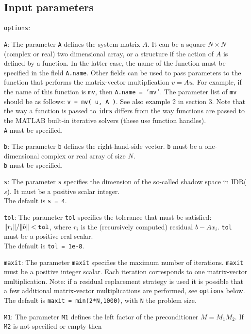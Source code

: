 \documentclass[prodmode,acmtoms]{acmsmall}
\begin{document}
\subsection{Input parameters}
\begin{describe}{{\tt options}:}
\item[{\tt A}:] The parameter {\tt A} defines the system matrix $A$. It can be a square $N \times N$ (complex or real) two dimensional array, 
or a structure if the action of $A$ is defined by a function. In the latter case, the name of the function must be specified in the field 
{\tt A.name}. Other fields can be used to pass parameters to the function that performs the matrix-vector multiplication $v = Au$.  For example, 
if the name of this function is {\tt mv}, then {\tt A.name = 'mv'}. The parameter list of 
{\tt mv} should be as follows: {\tt v = mv( u, A )}. See also example 2 in section 3. Note that the way a function is passed to {\tt idrs} differs
from the way functions are passed to the MATLAB built-in iterative solvers (these use function handles).\\
{\tt A} must be specified.
\item[{\tt b}:] The parameter {\tt b} defines the right-hand-side vector. {\tt b} must be a one-dimensional complex or real array of size $N$.\\
{\tt b} must be specified.
\item[{\tt s}:] The  parameter {\tt s} specifies the dimension of the so-called shadow space in IDR($s$). 
It must be a positive scalar integer.\\
The default is {\tt s = 4}.
\item[{\tt tol}:] The parameter {\tt tol} specifies the tolerance that must be satisfied: 
$\|r_i\|/\|b\| < {\tt tol}$, where $r_i$ is the (recursively computed) residual $b - Ax_i$. {\tt tol} must be a positive 
real scalar.\\
The default is {\tt tol = 1e-8}. 
\item[{\tt maxit}:] The parameter {\tt maxit} specifies the maximum number of iterations. {\tt maxit} must be
a positive integer scalar. Each iteration corresponds to one matrix-vector multiplication. 
Note: if a residual replacement strategy is used it is possible that a few additional matrix-vector multiplications are performed, see {\tt options} below.\\
The default is {\tt maxit = min(2*N,1000)}, with {\tt N} the problem size. 
\item[{\tt M1}:] The parameter {\tt M1} defines the left factor of the preconditioner $M = M_1 M_2$. If {\tt M2} is not specified or empty then 

\end{describe}
\end{document}
